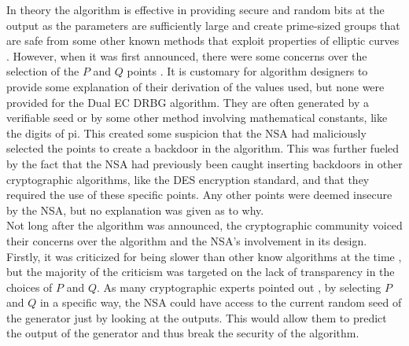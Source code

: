 In theory the algorithm is effective in providing secure and random bits at the output as the parameters are sufficiently large and create prime-sized groups that are safe from some other known methods that exploit properties of elliptic curves \cite{secure-randomness}. However, when it was first announced, there were some concerns over the selection of the $P$ and $Q$ points \cite{green-2013-dualec-flaws}. It is customary for algorithm designers to provide some explanation of their derivation of the values used, but none were provided for the Dual EC DRBG algorithm. They are often generated by a verifiable seed or by some other method involving mathematical constants, like the digits of pi. This created some suspicion that the NSA had maliciously selected the points to create a backdoor in the algorithm. This was further fueled by the fact that the NSA had previously been caught inserting backdoors in other cryptographic algorithms, like the DES encryption standard, and that they required the use of these specific points. Any other points were deemed insecure by the NSA, but no explanation was given as to why.
\\

Not long after the algorithm was announced, the cryptographic community voiced their concerns over the algorithm and the NSA's involvement in its design. Firstly, it was criticized for being slower than other know algorithms at the time \cite{green-2013-dualec-flaws}, but the majority of the criticism was targeted on the lack of transparency in the choices of $P$ and $Q$. As many cryptographic experts pointed out \cite{comments-on-dual-ec-drbg} \cite{ecdsa}, by selecting $P$ and $Q$ in a specific way, the NSA could have access to the current random seed of the generator just by looking at the outputs. This would allow them to predict the output of the generator and thus break the security of the algorithm.


